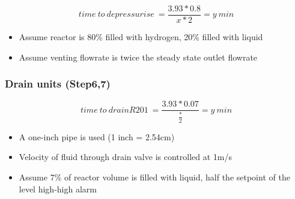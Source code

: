     \begin{equation}
        time\:to\:depressurise\:=\frac{3.93 * 0.8}{x * 2}=y\:min
    \end{equation}
    
    \begin{itemize}
        \item Assume reactor is 80\% filled with hydrogen, 20\% filled with liquid
        \item Assume venting flowrate is twice the steady state outlet flowrate
    \end{itemize}
    
 \subsubsection{Drain units (Step6,7)}   

    \begin{equation}
        time\:to\:drain R201\:=\frac{3.93 * 0.07}{\frac * 2}=y\:min
    \end{equation}
    
    \begin{itemize}
        \item A one-inch pipe is used (1 inch = 2.54cm)
        \item Velocity of fluid through drain valve is controlled at 1m/s
        \item Assume 7\% of reactor volume is filled with liquid, half the setpoint of the level high-high alarm
    \end{itemize}